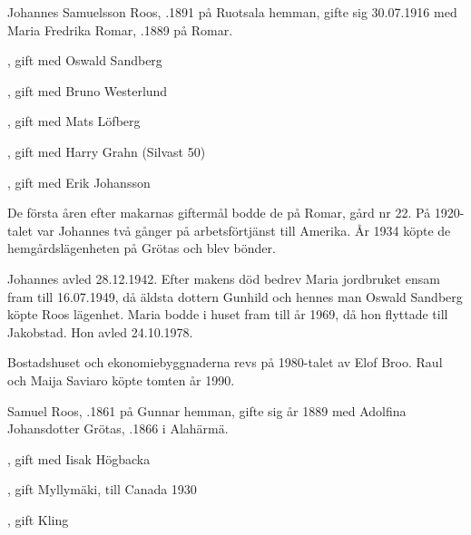 %
Johannes Samuelsson Roos, .1891 på Ruotsala hemman, gifte sig 30.07.1916 med Maria Fredrika Romar, .1889 på Romar.
\begin{jhchildren}
  \item {}, gift med Oswald Sandberg
  \item {}, gift med Bruno Westerlund
  \item {}, gift med Mats Löfberg
  \item {}, gift med Harry Grahn (Silvast 50)
  \item {}, gift med Erik Johansson
\end{jhchildren}

De första åren efter makarnas giftermål bodde de på Romar, gård nr 22. På 1920-talet var Johannes två gånger på arbetsförtjänst till Amerika. År 1934 köpte de hemgårdslägenheten på Grötas och blev bönder.

Johannes avled 28.12.1942. Efter makens död bedrev Maria jordbruket ensam fram till 16.07.1949, då äldsta dottern Gunhild och hennes man Oswald Sandberg köpte Roos lägenhet. Maria bodde i huset fram till år 1969, då hon flyttade till Jakobstad. Hon avled 24.10.1978.

Bostadshuset och ekonomiebyggnaderna revs på 1980-talet av Elof Broo. Raul och Maija Saviaro köpte tomten år 1990.


%
Samuel Roos, .1861 på Gunnar hemman, gifte sig år 1889 med Adolfina Johansdotter Grötas, .1866 i Alahärmä.
\begin{jhchildren}
  \item {}, gift med Iisak Högbacka
  \item {}
  \item {}
  \item {}
  \item {}, gift Myllymäki, till Canada 1930
  \item {}, gift Kling
  \item {}
  \item {}
  \item {}
\end{jhchildren}

